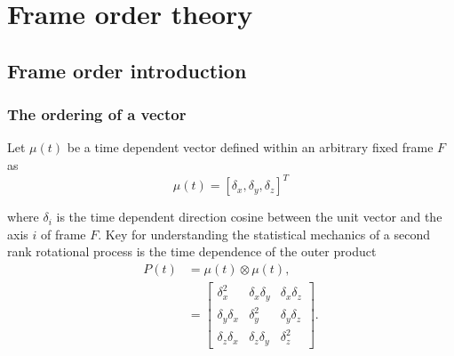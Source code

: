 
\section{Frame order theory}





\subsection{Frame order introduction}





\subsubsection{The ordering of a vector}

Let $\mu(t)$ be a time dependent vector defined within an arbitrary fixed frame $F$ as
\begin{equation}
    \mu(t) = \left[ \delta_x, \delta_y, \delta_z \right]^T
\end{equation}

where $\delta_i$ is the time dependent direction cosine between the unit vector and the axis $i$ of frame $F$.
Key for understanding the statistical mechanics of a second rank rotational process is the time dependence of the outer product
\begin{align}
    P(t) &= \mu(t) \otimes \mu(t) , \label{eq: time dependent vector outer product} \\
            &= \begin{bmatrix}
                \delta_x^2       & \delta_x\delta_y & \delta_x\delta_z \\
                \delta_y\delta_x & \delta_y^2       & \delta_y\delta_z \\
                \delta_z\delta_x & \delta_z\delta_y & \delta_z^2
               \end{bmatrix} .
\end{align}

